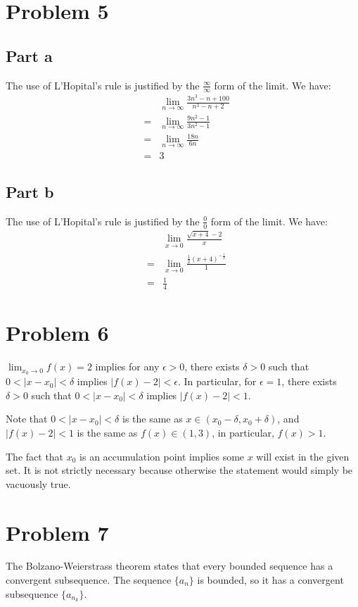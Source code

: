 \documentclass{article}
\begin{document}
\section*{Problem 5}
\subsection*{Part a}
The use of L'Hopital's rule is justified by the $ \frac{\infty}{\infty} $ form of the limit. We have:
\begin{eqnarray*}
  & & \lim_{n \to \infty}\frac{3n^3 - n + 100}{n^3 - n + 2} \\
  &=& \lim_{n \to \infty}\frac{9n^2 - 1}{3n^2 - 1} \\
  &=& \lim_{n \to \infty}\frac{18n}{6n} \\
  &=& 3 
\end{eqnarray*}

\subsection*{Part b}
The use of L'Hopital's rule is justified by the $ \frac{0}{0} $ form of the limit. We have:
\begin{eqnarray*}
  & & \lim_{x \to 0}\frac{\sqrt{x + 4} - 2}{x} \\
  &=& \lim_{x \to 0}\frac{\frac{1}{2}(x + 4)^{-\frac{1}{2}}}{1} \\
  &=& \frac{1}{4} 
\end{eqnarray*}

\section*{Problem 6}
$ \lim_{x_0 \to 0} f(x) = 2 $ implies for any $ \epsilon > 0 $, there exists $ \delta > 0 $ such that $ 0 < |x - x_0| < \delta $ implies $ |f(x) - 2| < \epsilon $. In particular, for $ \epsilon = 1 $, there exists $ \delta > 0 $ such that $ 0 < |x - x_0| < \delta $ implies $ |f(x) - 2| < 1 $.

Note that $ 0 < | x - x_0| < \delta $ is the same as $ x \in (x_0 - \delta, x_0 + \delta) $, and $ |f(x) - 2| < 1 $ is the same as $ f(x) \in (1, 3) $, in particular, $ f(x) > 1 $.

The fact that $ x_0 $ is an accumulation point implies some $ x $ will exist in the given set. It is not strictly necessary because otherwise the statement would simply be vacuously true.

\section*{Problem 7}
The Bolzano-Weierstrass theorem states that every bounded sequence has a convergent subsequence. The sequence $ \{a_n\} $ is bounded, so it has a convergent subsequence $ \{a_{n_k}\} $.
\end{document}

